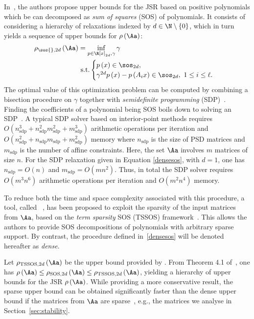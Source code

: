In~\cite{parrilo}, the authors propose upper bounds for the JSR based on positive polynomials which be can decomposed as \emph{sum of squares} (SOS) of polynomials.
%
It consists of considering a hierarchy of relaxations indexed by $d\in\N\setminus \left\{ 0 \right\}$, which in turn yields a sequence of upper bounds for $\rho\left(\Aa\right)$:
\begin{align}
    \label{densesos}
    \rho_{\sos{},2d}\left(\Aa\right) &= \inf_{p\in\R\left[x\right]_{2d},\gamma}  \gamma \\
    &\textrm{ s.t.} 
    \begin{cases} 
        p\left(x\right)\in\sos_{2d},\\
        \gamma^{2d}p\left(x\right)-p\left(A_ix\right)\in\sos_{2d},\ 1 \leq i \leq \ell.
    \end{cases} \nonumber
\end{align}
%
The optimal value of this optimization problem can be computed by combining a bisection procedure on $\gamma$ together with \emph{semidefinite programming} (SDP)~\cite{wolkowicz2012handbook}.
Finding the coefficients of a polynomial being SOS boils down to solving an SDP~\cite{re2, parrilo2000structured, lasserre2001global}.
A typical SDP solver based on interior-point methods requires $O(n_{\text{sdp}}^3 + n_{\text{sdp}}^2 m_{\text{sdp}}^2 + m_{\text{sdp}}^3)$ arithmetic operations per iteration and $O(n_{\text{sdp}}^2 + n_{\text{sdp}} m_{\text{sdp}} + m_{\text{sdp}}^2)$ memory where $n_{\text{sdp}}$ is the size of PSD matrices and $m_{\text{sdp}}$ is the number of affine constraints.
Here, the set $\Aa$ involves $m$ matrices of size $n$.
For the SDP relaxation given in Equation \eqref{densesos}, with $d = 1$, one has $n_{\text{sdp}} = O(n)$ and $m_{\text{sdp}} = O(m n^2)$.
Thus, in total the SDP solver requires $O(m^3 n^6)$ arithmetic operations per iteration and $O(m^2 n^4)$ memory.

To reduce both the time and space complexity associated with this procedure, a tool, called ~\cite{sparsejsr}, has been proposed to exploit the sparsity of the input matrices from $\Aa$, based on the \emph{term sparsity} SOS (TSSOS) framework~\cite{tssos}.
This allows the authors to provide SOS decompositions of polynomials with arbitrary sparse support.
By contrast, the procedure defined in~\eqref{densesos} will be denoted hereafter as \emph{dense}.

Let $\rho_{\textrm{TSSOS},2d}\left(\Aa\right)$ be the upper bound provided by .
From Theorem 4.1 of~\cite{sparsejsr}, one has $\rho\left(\Aa\right) \leq \rho_{\textrm{SOS},2d}\left(\Aa\right) \leq \rho_{\textrm{TSSOS},2d}\left(\Aa\right)$, yielding a hierarchy of upper bounds for the JSR $\rho\left(\Aa\right)$.
While providing a more conservative result, the sparse upper bound can be obtained significantly faster than the dense upper bound if the matrices from $\Aa$ are sparse~\cite{sparsejsr}, e.g., the matrices we analyse in Section~\ref{sec:stability}.
